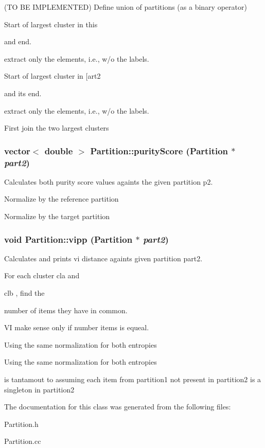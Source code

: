 (TO BE IMPLEMENTED) Define union of partitions (as a binary operator) 

Start of largest cluster in this

and end.

extract only the elements, i.e., w/o the labels.

Start of largest cluster in [art2

and its end.

extract only the elements, i.e., w/o the labels.

First join the two largest clusters 
\subsubsection{\setlength{\rightskip}{0pt plus 5cm}vector$<$ double $>$ Partition::purity\-Score ({\bf Partition} $\ast$ {\em part2})}\label{classPartition_a37}


Calculates both purity score values againts the given partition p2. 

Normalize by the reference partition

Normalize by the target partition 
\subsubsection{\setlength{\rightskip}{0pt plus 5cm}void Partition::vipp ({\bf Partition} $\ast$ {\em part2})}\label{classPartition_a32}


Calculates and prints vi distance againts given partition part2. 

For each cluster cla and

clb , find the 

number of items they have in common.

VI make sense only if number items is equeal.

Using the same normalization for both entropies

Using the same normalization for both entropies

is tantamout to assuming each item from partition1 not present in partition2 is a singleton in partition2 

The documentation for this class was generated from the following files:\begin{CompactItemize}
\item 
Partition.h\item 
Partition.cc\end{CompactItemize}
